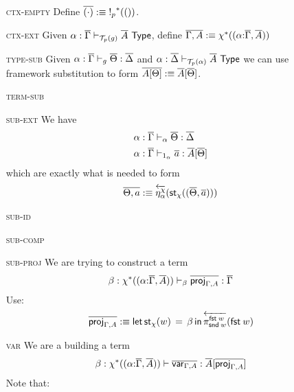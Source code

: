 \documentclass[10pt]{article}
\theoremstyle{definition}
\newcommand\dsd[1]{\ensuremath{\mathsf{#1}}}
\newcommand{\yields}{\vdash}
\newcommand{\TYPE}{\,\,\mathsf{Type}}
\newcommand{\app}[2]{\ensuremath{#1 \: #2}}
\newcommand{\telety}[3]{\ensuremath{(#1{:}#2,#3)}}
\newcommand{\mt}[0]{\ensuremath{()}}
\newcommand{\fst}[1]{\app{\dsd{fst}}{#1}}
\newcommand{\snd}[1]{\app{\dsd{snd}}{#1}}
\newcommand{\rewrite}[2]{\overleftarrow{#1}(#2)}
\newcommand\St[2]{\ensuremath{{#1}^*(#2)}}
\newcommand\StI[2]{\ensuremath{\mathsf{st}_{#1}(#2)}}
\newcommand\StE[4]{\ensuremath{\mathsf{let} \, \StI{#1}{#3} \, = \, {#2} \, \mathsf{in} \, #4}}
\newcommand\El[2]{\mathcal{T}_{#1}(#2)}
\begin{document}
\begin{itemize}
\begin{enumerate}
\item[\textsc{ctx-empty}] Define $\upstairs{(\cdot)} :\equiv \St{!_p}{\mt}$.
\item[\textsc{ctx-ext}] Given $\alpha : \upstairs{\Gamma} \yields_{\El{p}{g}} \upstairs{A} \TYPE$, define $\upstairs{\Gamma, A} :\equiv \St{\chi}{\telety{\alpha}{\upstairs{\Gamma}}{\upstairs{A}}}$
\item[\textsc{type-sub}] Given $\alpha : \upstairs{\Gamma} \yields_g \upstairs{\Theta} : \upstairs{\Delta}$ and $\alpha : \upstairs{\Delta} \yields_{\El{p}{\alpha}} \upstairs{A} \TYPE$ we can use framework substitution to form $\overline{A[\Theta]} :\equiv \overline{A}[\overline{\Theta}]$.
\item[\textsc{term-sub}] 
\item[\textsc{sub-ext}] We have
\begin{align*}
\alpha : \upstairs{\Gamma} &\yields_\alpha \upstairs{\Theta} : \upstairs{\Delta} \\
\alpha : \upstairs{\Gamma} &\yields_{1_\alpha} \upstairs{a} : \upstairs{A}[\upstairs{\Theta}]
\end{align*}
which are exactly what is needed to form
\begin{align*}
\upstairs{\Theta, a} :\equiv \rewrite{\eta^\chi_{\alpha}}{\StI{\chi}{(\upstairs{\Theta}, \upstairs{a})}}
\end{align*}
\item[\textsc{sub-id}] 
\item[\textsc{sub-comp}] 
\item[\textsc{sub-proj}] We are trying to construct a term
\begin{align*}
\beta : \St{\chi}{\telety{\alpha}{\upstairs{\Gamma}}{\upstairs{A}}} \yields_\beta \upstairs{\proj{\Gamma, A}} : \upstairs{\Gamma}
\end{align*}
Use:
\begin{align*}
\upstairs{\proj{\Gamma, A}} :\equiv \StE{\chi}{\beta}{w}{\rewrite{\pi^{\fst w}_{\snd w}}{\fst w}}
\end{align*}
\item[\textsc{var}] We are a building a term
\begin{align*}
\beta : \St{\chi}{\telety{\alpha}{\upstairs{\Gamma}}{\upstairs{A}}} \yields \upstairs{\var{\Gamma, A}} : \upstairs{A}[\upstairs{\proj{\Gamma, A}}]
\end{align*}
Note that:
\begin{align*}

\end{align*}
\end{enumerate}
\end{itemize}
\end{document}
